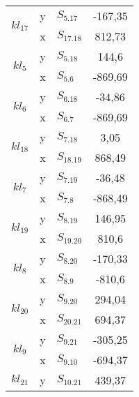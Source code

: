 \begin{table}[htbp]
\begin{tabular}{|c|l|l|c|}
\multirow{2}{*}{$kl_{17}$} & y                  & $S_{5.17}$            & -167,35          \\ \cline{2-4} 
                          & x                  & $S_{17.18}$           & 812,73           \\ \hline
\multirow{2}{*}{$kl_{5}$}  & y                  & $S_{5.18}$            & 144,6             \\ \cline{2-4} 
                          & x                  & $S_{5.6}$             & -869,69          \\ \hline
\multirow{2}{*}{$kl_{6}$}  & y                  & $S_{6.18}$            & -34,86            \\ \cline{2-4} 
                          & x                  & $S_{6.7}$             & -869,69          \\ \hline
\multirow{2}{*}{$kl_{18}$} & y                  & $S_{7.18}$            & 3,05              \\ \cline{2-4} 
                          & x                  & $S_{18.19}$           & 868,49           \\ \hline
\multirow{2}{*}{$kl_{7}$}  & y                  & $S_{7.19}$            & -36,48            \\ \cline{2-4} 
                          & x                  & $S_{7.8}$             & -868,49         \\ \hline
\multirow{2}{*}{$kl_{19}$} & y                  & $S_{8.19}$            & 146,95             \\ \cline{2-4} 
                          & x                  & $S_{19.20}$           & 810,6           \\ \hline
\multirow{2}{*}{$kl_{8}$}  & y                  & $S_{8.20}$            & -170,33           \\ \cline{2-4} 
                          & x                  & $S_{8.9}$             & -810,6         \\ \hline
\multirow{2}{*}{$kl_{20}$} & y                  & $S_{9.20}$            & 294,04            \\ \cline{2-4} 
                          & x                  & $S_{20.21}$           & 694,37            \\ \hline
\multirow{2}{*}{$kl_{9}$}  & y                  & $S_{9.21}$            & -305,25           \\ \cline{2-4} 
                          & x                  & $S_{9.10}$            & -694,37         \\ \hline
\multirow{2}{*}{$kl_{21}$} & y                  & $S_{10.21}$           & 439,37            \\ \cline{2-4} 

\end{tabular}
\end{table}
